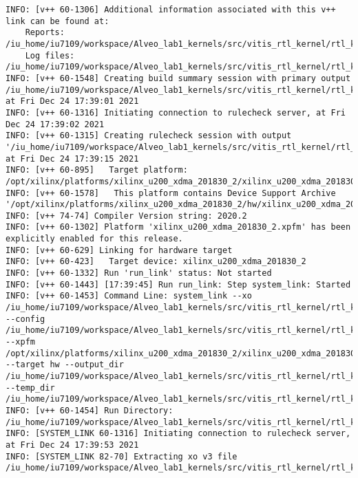 \begin{center}
    \captionsetup{justification=raggedright,singlelinecheck=off}
    \begin{lstlisting}[label=lst:vlog,caption=Файл v++\_vinc.log]
INFO: [v++ 60-1306] Additional information associated with this v++ link can be found at:
	Reports: /iu_home/iu7109/workspace/Alveo_lab1_kernels/src/vitis_rtl_kernel/rtl_kernel_wizard_2/_x/reports/link
	Log files: /iu_home/iu7109/workspace/Alveo_lab1_kernels/src/vitis_rtl_kernel/rtl_kernel_wizard_2/_x/logs/link
INFO: [v++ 60-1548] Creating build summary session with primary output /iu_home/iu7109/workspace/Alveo_lab1_kernels/src/vitis_rtl_kernel/rtl_kernel_wizard_2/vinc.xclbin.link_summary, at Fri Dec 24 17:39:01 2021
INFO: [v++ 60-1316] Initiating connection to rulecheck server, at Fri Dec 24 17:39:02 2021
INFO: [v++ 60-1315] Creating rulecheck session with output '/iu_home/iu7109/workspace/Alveo_lab1_kernels/src/vitis_rtl_kernel/rtl_kernel_wizard_2/_x/reports/link/v++_link_vinc_guidance.html', at Fri Dec 24 17:39:15 2021
INFO: [v++ 60-895]   Target platform: /opt/xilinx/platforms/xilinx_u200_xdma_201830_2/xilinx_u200_xdma_201830_2.xpfm
INFO: [v++ 60-1578]   This platform contains Device Support Archive '/opt/xilinx/platforms/xilinx_u200_xdma_201830_2/hw/xilinx_u200_xdma_201830_2.dsa'
INFO: [v++ 74-74] Compiler Version string: 2020.2
INFO: [v++ 60-1302] Platform 'xilinx_u200_xdma_201830_2.xpfm' has been explicitly enabled for this release.
INFO: [v++ 60-629] Linking for hardware target
INFO: [v++ 60-423]   Target device: xilinx_u200_xdma_201830_2
INFO: [v++ 60-1332] Run 'run_link' status: Not started
INFO: [v++ 60-1443] [17:39:45] Run run_link: Step system_link: Started
INFO: [v++ 60-1453] Command Line: system_link --xo /iu_home/iu7109/workspace/Alveo_lab1_kernels/src/vitis_rtl_kernel/rtl_kernel_wizard_2/rtl_kernel_wizard_2.xo --config /iu_home/iu7109/workspace/Alveo_lab1_kernels/src/vitis_rtl_kernel/rtl_kernel_wizard_2/_x/link/int/syslinkConfig.ini --xpfm /opt/xilinx/platforms/xilinx_u200_xdma_201830_2/xilinx_u200_xdma_201830_2.xpfm --target hw --output_dir /iu_home/iu7109/workspace/Alveo_lab1_kernels/src/vitis_rtl_kernel/rtl_kernel_wizard_2/_x/link/int --temp_dir /iu_home/iu7109/workspace/Alveo_lab1_kernels/src/vitis_rtl_kernel/rtl_kernel_wizard_2/_x/link/sys_link
INFO: [v++ 60-1454] Run Directory: /iu_home/iu7109/workspace/Alveo_lab1_kernels/src/vitis_rtl_kernel/rtl_kernel_wizard_2/_x/link/run_link
INFO: [SYSTEM_LINK 60-1316] Initiating connection to rulecheck server, at Fri Dec 24 17:39:53 2021
INFO: [SYSTEM_LINK 82-70] Extracting xo v3 file /iu_home/iu7109/workspace/Alveo_lab1_kernels/src/vitis_rtl_kernel/rtl_kernel_wizard_2/rtl_kernel_wizard_2.xo

\end{lstlisting}
\end{center}
